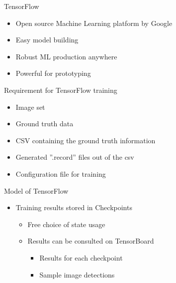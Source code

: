 \begin{frame}{TensorFlow}
    \begin{itemize}
        \item Open source Machine Learning platform  by Google
        \item Easy model building
        \item Robust ML production anywhere
        \item Powerful for prototyping
    \end{itemize}
\end{frame}

\begin{frame}{Requirement for TensorFlow training}
    \begin{itemize}
        \item Image set
        \item Ground truth data
        \item CSV containing the ground truth information 
        \item Generated ''.record'' files out of the csv
        \item Configuration file for training
    \end{itemize}
\end{frame}

\begin{frame}{Model of TensorFlow}
    \begin{itemize}
        \item Training results stored in Checkpoints
            \begin{itemize}
                \item Free choice of state usage
                \item Results can be consulted on TensorBoard
                    \begin{itemize}
                        \item Results for each checkpoint
                        \item Sample image detections
                    \end{itemize}
            \end{itemize}
    \end{itemize}
\end{frame}
